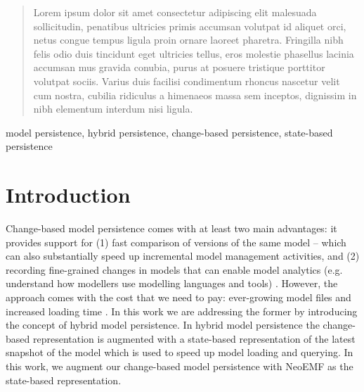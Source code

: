 \documentclass[10pt,conference]{IEEEtran}
\begin{document}




\maketitle

\begin{abstract}
\label{abstract}
Lorem ipsum dolor sit amet consectetur adipiscing elit malesuada sollicitudin, penatibus ultricies primis accumsan volutpat id aliquet orci, netus congue tempus ligula proin ornare laoreet pharetra. Fringilla nibh felis odio duis tincidunt eget ultricies tellus, eros molestie phasellus lacinia accumsan mus gravida conubia, purus at posuere tristique porttitor volutpat sociis. Varius duis facilisi condimentum rhoncus nascetur velit cum nostra, cubilia ridiculus a himenaeos massa sem inceptos, dignissim in nibh elementum interdum nisi ligula.
\end{abstract}
%
\begin{IEEEkeywords} 
model persistence, hybrid persistence, change-based persistence, state-based persistence
\end{IEEEkeywords}

%
\IEEEpeerreviewmaketitle

\section{Introduction}
\label{sec:introduction}
Change-based model persistence \cite{DBLP:conf/models/YohannisKP17} comes with at least two main advantages: it provides support for (1) fast comparison of versions of the same model \cite{DBLP:conf/sde/LippeO92,DBLP:conf/caise/IgnatN05,DBLP:conf/edoc/KoegelHLHD10,koegel2010emfstore}  -- which can also substantially speed up incremental model management activities, and (2) recording fine-grained changes in models that can enable model analytics (e.g. understand how modellers use modelling languages and tools) \cite{DBLP:journals/entcs/RobbesL07}. However, the approach comes with the cost that we need to pay: ever-growing model files \cite{DBLP:conf/edoc/KoegelHLHD10,DBLP:journals/entcs/RobbesL07} and increased loading time \cite{mens2002state}. In this work we are addressing the former by introducing the concept of hybrid model persistence. In hybrid model persistence the change-based representation is augmented with a state-based representation of the latest snapshot of the model which is used to speed up model loading and querying. In this work, we augment our change-based model persistence with NeoEMF \cite{daniel2016neoemf} as the state-based representation. 
\end{document}
